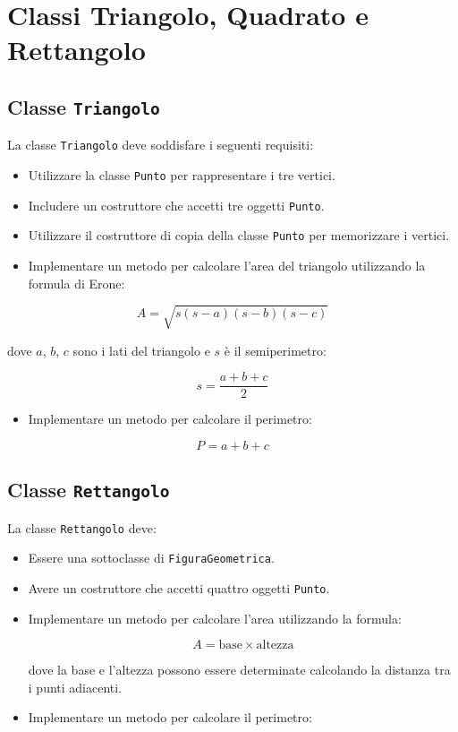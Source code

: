 \documentclass{article}
\begin{document}
\section{Classi Triangolo, Quadrato e Rettangolo}
\begin{multicols}{2}
\subsection{Classe \texttt{Triangolo}}
La classe \texttt{Triangolo} deve soddisfare i seguenti requisiti:
\begin{itemize}
\item Utilizzare la classe \texttt{Punto} per rappresentare i tre vertici.
\item Includere un costruttore che accetti tre oggetti \texttt{Punto}.
\item Utilizzare il costruttore di copia della classe \texttt{Punto} per memorizzare i vertici.
\item Implementare un metodo per calcolare l'area del triangolo utilizzando la formula di Erone:
\end{itemize}

\[
A = \sqrt{s(s-a)(s-b)(s-c)}
\]

dove $a$, $b$, $c$ sono i lati del triangolo e $s$ è il semiperimetro:

\[
s = \frac{a + b + c}{2}
\]

\begin{itemize}
\item Implementare un metodo per calcolare il perimetro:
\end{itemize}

\[
P = a + b + c
\]

\subsection{Classe \texttt{Rettangolo}}
La classe \texttt{Rettangolo} deve:
\begin{itemize}
\item Essere una sottoclasse di \texttt{FiguraGeometrica}.
\item Avere un costruttore che accetti quattro oggetti \texttt{Punto}.
\item Implementare un metodo per calcolare l'area utilizzando la formula:

\[
A = \text{base} \times \text{altezza}
\]

dove la base e l'altezza possono essere determinate calcolando la distanza tra i punti adiacenti.
\item Implementare un metodo per calcolare il perimetro:


\end{itemize}
\end{multicols}
\end{document}
